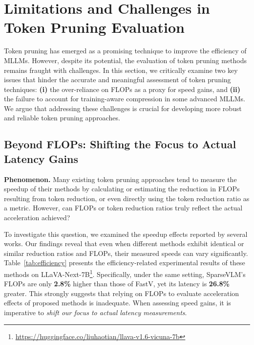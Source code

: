 \section{Limitations and Challenges in Token Pruning Evaluation}
Token pruning has emerged as a promising technique to improve the efficiency of MLLMs. However, despite its potential, the evaluation of token pruning methods remains fraught with challenges. 
In this section, we critically examine two key issues that hinder the accurate and meaningful assessment of token pruning techniques: \textbf{(i)} the over-reliance on FLOPs as a proxy for speed gains, and \textbf{(ii)} the failure to account for training-aware compression in some advanced MLLMs. 
We argue that addressing these challenges is crucial for developing more robust and reliable token pruning approaches.

\subsection{Beyond FLOPs: Shifting the Focus to Actual Latency Gains}

\noindent\textbf{Phenomenon.} Many existing token pruning approaches tend to measure the speedup of their methods by calculating or estimating the reduction in FLOPs resulting from token reduction, or even directly using the token reduction ratio as a metric. However, can FLOPs or token reduction ratios truly reflect the actual acceleration achieved?

To investigate this question, we examined the speedup effects reported by several works. Our findings reveal that even when different methods exhibit identical or similar reduction ratios and FLOPs, their measured speeds can vary significantly. 
Table~\ref{tab:efficiency} presents the efficiency-related experimental results of these methods on LLaVA-Next-7B\footnote{\url{https://huggingface.co/liuhaotian/llava-v1.6-vicuna-7b}}. Specifically, under the same setting, SparseVLM's FLOPs are only \textbf{2.8\%} higher than those of FastV, yet its latency is \textbf{26.8\%} greater. 
This strongly suggests that relying on FLOPs to evaluate acceleration effects of proposed methods is inadequate. When assessing speed gains, it is imperative to \emph{shift our focus to actual latency measurements}.

